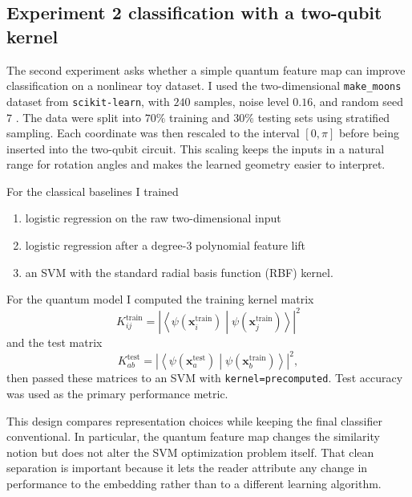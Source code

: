 \documentclass[11pt]{article}
\begin{document}
\subsection{Experiment 2 classification with a two-qubit kernel}

The second experiment asks whether a simple quantum feature map can improve classification on a nonlinear toy dataset. I used the two-dimensional \texttt{make\_moons} dataset from \texttt{scikit-learn}, with $240$ samples, noise level $0.16$, and random seed $7$ \cite{sklearn}. The data were split into $70\%$ training and $30\%$ testing sets using stratified sampling. Each coordinate was then rescaled to the interval $[0,\pi]$ before being inserted into the two-qubit circuit. This scaling keeps the inputs in a natural range for rotation angles and makes the learned geometry easier to interpret.

For the classical baselines I trained
\begin{enumerate}[label=\arabic*.]
\item logistic regression on the raw two-dimensional input
\item logistic regression after a degree-$3$ polynomial feature lift
\item an SVM with the standard radial basis function (RBF) kernel.
\end{enumerate}
For the quantum model I computed the training kernel matrix
\begin{equation}
K^{\mathrm{train}}_{ij}
=
\left|\left\langle \psi(\bm{x}^{\mathrm{train}}_i)\middle|\psi(\bm{x}^{\mathrm{train}}_j)\right\rangle\right|^2
\label{eq:trainkernel}
\end{equation}
and the test matrix
\begin{equation}
K^{\mathrm{test}}_{ab}
=
\left|\left\langle \psi(\bm{x}^{\mathrm{test}}_a)\middle|\psi(\bm{x}^{\mathrm{train}}_b)\right\rangle\right|^2,
\label{eq:testkernel}
\end{equation}
then passed these matrices to an SVM with \texttt{kernel=precomputed}. Test accuracy was used as the primary performance metric.

This design compares representation choices while keeping the final classifier conventional. In particular, the quantum feature map changes the similarity notion but does not alter the SVM optimization problem itself. That clean separation is important because it lets the reader attribute any change in performance to the embedding rather than to a different learning algorithm.
\end{document}
